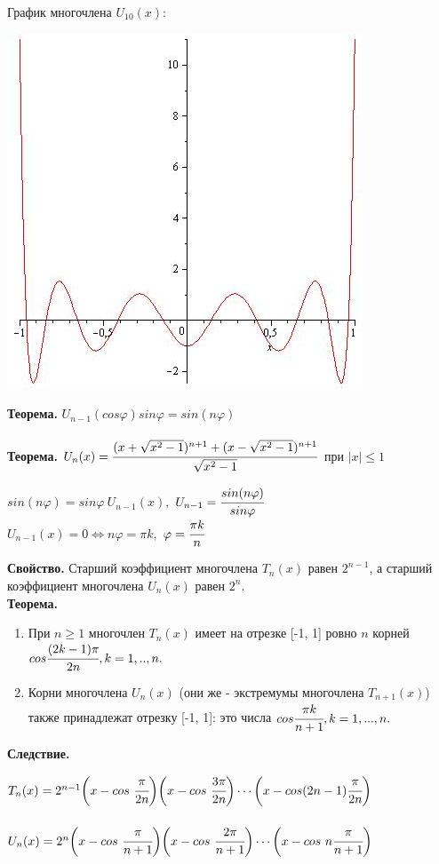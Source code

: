 \documentclass[12pt]{article}
\theoremstyle{definition}
\numberwithin{equation}{section}
\begin{document}
График многочлена $U_{10}(x)$:\begin{center}
\includegraphics[scale=0.5]{U10.jpg} \end{center}
\textbf{Теорема.}
$U_{n-1}(cos \varphi)sin \varphi = sin(n \varphi)$\\
\\
\textbf{Теорема.}
$U_n(x)=\cfrac{(x+\sqrt{x^2-1})^{n+1}+(x-\sqrt{x^2-1})^{n+1}}{\sqrt{x^2-1}}$ при $ |x| \leqslant 1$
\begin{center}
$sin(n\varphi)=sin\varphi ~ U_{n-1}(x),$ $ U_{n-1}=\cfrac{sin(n\varphi)}{sin \varphi}$\\
$U_{n-1}(x) = 0 \Leftrightarrow n\varphi=\pi k,$ $\varphi=\cfrac{\pi k}{n}$
\end{center}
\textbf{Свойство.}
Старший коэффициент многочлена $T_n(x)$ равен $2^{n-1}$, а старший коэффициент многочлена $U_n(x)$ равен $2^n$.\\
\newpage
\noindent \textbf{Теорема.}\begin{enumerate}
\item При $n \geqslant 1$ многочлен $T_n(x)$ имеет на отрезке [-1, 1] ровно $n$ корней $cos\cfrac{(2k-1)\pi}{2n}, k=1,..,n.$
\item Корни многочлена $U_n(x)$ (они же - экстремумы многочлена $T_{n+1}(x)$) также принадлежат отрезку [-1, 1]: это числа $cos\cfrac{\pi k}{n+1}, k=1,...,n.$
\end{enumerate}
\textbf{Следствие.}\begin{center}
$T_n(x)=2^{n-1} \bigg(x-cos~\cfrac{\pi}{2n}\bigg) \bigg(x-cos~\cfrac{3\pi}{2n}\bigg)\cdots \bigg(x-cos(2n-1)\cfrac{\pi}{2n} \bigg)$\\
~\\
$U_n(x)=2^n \bigg(x-cos~\cfrac{\pi}{n+1}\bigg) \bigg(x-cos~\cfrac{2\pi}{n+1} \bigg)\cdots \bigg(x-cos ~n\cfrac{\pi}{n+1}\bigg)$\end{center}
\end{document}
